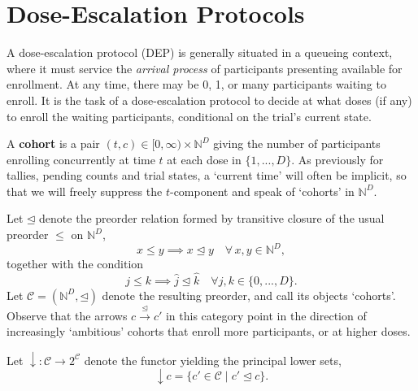 \documentclass{article}
\newcommand{\N}{\mathbb{N}}
\newcommand{\C}{\ensuremath{\mathcal{C}}}
\begin{document}
\section{Dose-Escalation Protocols}

A dose-escalation protocol (DEP) is generally situated in a queueing context, where it must service the {\em arrival process} of participants presenting available for enrollment.  At any time, there may be 0, 1, or many participants waiting to enroll.  It is the task of a dose-escalation protocol to decide at what doses (if any) to enroll the waiting participants, conditional on the trial's current state.

\begin{defn}
  A \textbf{cohort} is a pair $(t,c) \in [0,\infty) \times \N^D$ giving the number of participants enrolling concurrently at time $t$ at each dose in $\{1,...,D\}$.  As previously for tallies, pending counts and trial states, a `current time' will often be implicit, so that we will freely suppress the $t$-component and speak of `cohorts' in $\N^D$.
\end{defn}

\begin{defn}\label{cohcat}
  Let $\unlhd$ denote the preorder relation formed by transitive closure of the usual preorder $\le$ on $\N^D$,
  $$
  x \le y \implies x \unlhd y \quad\forall\, x, y \in \N^D,
  $$
  together with the condition
  $$
  j \le k \implies \widehat{j} \unlhd \widehat{k} \quad\forall j,k \in \{0,...,D\}.
  $$
  Let $\C = (\N^D,\unlhd)$ denote the resulting preorder, and call its objects `cohorts'.  Observe that the arrows $c \xrightarrow{\unlhd} c'$ in this category point in the direction of increasingly `ambitious' cohorts that enroll more participants, or at higher doses.
\end{defn}

\begin{nota}
  Let $\downarrow : \C \rightarrow 2^\C$ denote the functor yielding the principal lower sets,
  $$
  \downarrow c = \{ c' \in \C \mid c' \unlhd c \}.
  $$
\end{nota}
\end{document}
